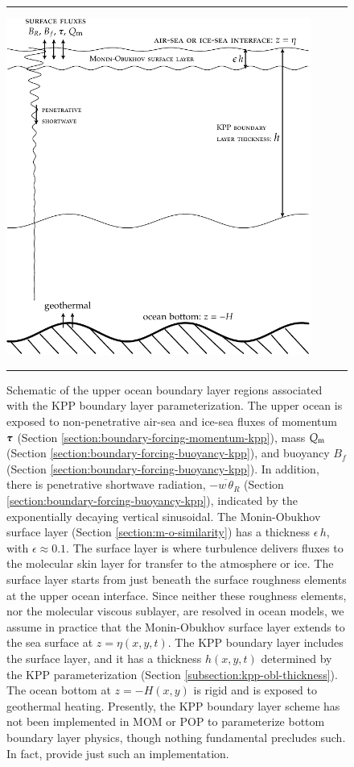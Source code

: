 \begin{figure}[h!t]
\rule{\textwidth}{0.005in}
\begin{center}
\includegraphics[angle=0,width=10cm]{./mfpic_figs/cvmix_kpp_boundary_layer.pdf}
\caption[KPP boundary layer schematic]{\sf Schematic of the upper
  ocean boundary layer regions associated with the KPP boundary layer
  parameterization.  The upper ocean is exposed to non-penetrative
  air-sea and ice-sea fluxes of momentum $\mbox{\boldmath $\tau$}$ (Section
  \ref{section:boundary-forcing-momentum-kpp}), mass $Q_{\mbox{\scriptsize m}}$(Section
  \ref{section:boundary-forcing-buoyancy-kpp}), and buoyancy $B_{f}$
  (Section \ref{section:boundary-forcing-buoyancy-kpp}).  In addition,
  there is penetrative shortwave radiation, $-\overline{w \,
    \theta}_{R}$ (Section
  \ref{section:boundary-forcing-buoyancy-kpp}), indicated by the
  exponentially decaying vertical sinusoidal.  The Monin-Obukhov
  surface layer (Section \ref{section:m-o-similarity}) has a thickness
  $\epsilon \, h$, with $\epsilon \approx 0.1$.  The surface layer is
  where turbulence delivers fluxes to the molecular skin layer for
  transfer to the atmosphere or ice.  The surface layer starts from
  just beneath the surface roughness elements at the upper ocean
  interface.  Since neither these roughness elements, nor the
  molecular viscous sublayer, are resolved in ocean models, we assume
  in practice that the Monin-Obukhov surface layer extends to the sea
  surface at $z=\eta(x,y,t)$.  The KPP boundary layer includes the
  surface layer, and it has a thickness $h(x,y,t)$ determined by the
  KPP parameterization (Section \ref{subsection:kpp-obl-thickness}).
  The ocean bottom at $z=-H(x,y)$ is rigid and is exposed to
  geothermal heating.  Presently, the KPP boundary layer scheme has
  not been implemented in MOM or POP to parameterize bottom boundary
  layer physics, though nothing fundamental precludes such.  In fact,
  \cite{Durski_etal2004} provide just such an implementation.}
\label{fig:boundary-layer-schematic-kpp}
\end{center}
\rule{\textwidth}{0.005in}
\end{figure}



